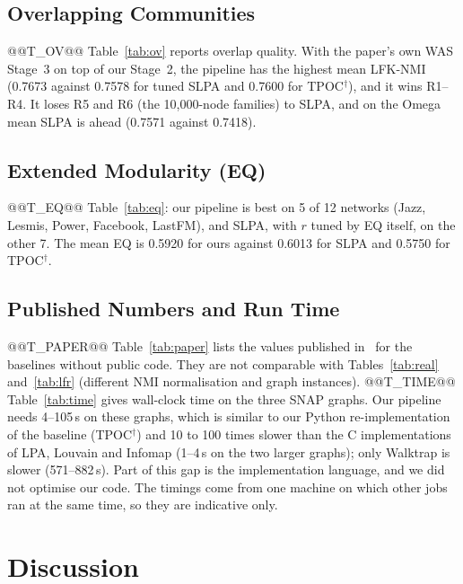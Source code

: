 \documentclass[conference]{IEEEtran}
\begin{document}
\subsection{Overlapping Communities}
@@T_OV@@
Table~\ref{tab:ov} reports overlap quality. With the paper's own WAS Stage~3 on top of our Stage~2, the pipeline has the highest mean LFK-NMI (0.7673 against 0.7578 for tuned SLPA and 0.7600 for TPOC$^{\dagger}$), and it wins R1--R4. It loses R5 and R6 (the 10{,}000-node families) to SLPA, and on the Omega mean SLPA is ahead (0.7571 against 0.7418).

\subsection{Extended Modularity (EQ)}
@@T_EQ@@
Table~\ref{tab:eq}: our pipeline is best on 5 of 12 networks (Jazz, Lesmis, Power, Facebook, LastFM), and SLPA, with $r$ tuned by EQ itself, on the other 7. The mean EQ is 0.5920 for ours against 0.6013 for SLPA and 0.5750 for TPOC$^{\dagger}$.

\subsection{Published Numbers and Run Time}
@@T_PAPER@@
Table~\ref{tab:paper} lists the values published in~\cite{kong2026} for the baselines without public code. They are not comparable with Tables~\ref{tab:real} and~\ref{tab:lfr} (different NMI normalisation and graph instances).
@@T_TIME@@
Table~\ref{tab:time} gives wall-clock time on the three SNAP graphs. Our pipeline needs 4--105\,s on these graphs, which is similar to our Python re-implementation of the baseline (TPOC$^{\dagger}$) and 10 to 100 times slower than the C implementations of LPA, Louvain and Infomap (1--4\,s on the two larger graphs); only Walktrap is slower (571--882\,s). Part of this gap is the implementation language, and we did not optimise our code. The timings come from one machine on which other jobs ran at the same time, so they are indicative only.

\section{Discussion}\label{sec:discussion}
\end{document}
